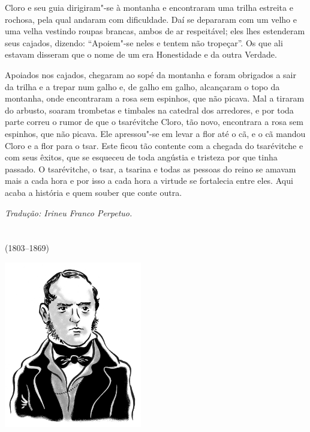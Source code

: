 Cloro e seu guia dirigiram"-se à montanha e encontraram uma trilha
estreita e rochosa, pela qual andaram com dificuldade. Daí se depararam
com um velho e uma velha vestindo roupas brancas, ambos de ar
respeitável; eles lhes estenderam seus cajados, dizendo: ``Apoiem"-se
neles e tentem não tropeçar''. Os que ali estavam disseram que o nome de
um era Honestidade e da outra Verdade.

Apoiados nos cajados, chegaram ao sopé da montanha e foram obrigados a
sair da trilha e a trepar num galho e, de galho em galho, alcançaram o
topo da montanha, onde encontraram a rosa sem espinhos, que não picava.
Mal a tiraram do arbusto, soaram trombetas e timbales na catedral dos
arredores, e por toda parte correu o rumor de que o tsarévitche Cloro,
tão novo, encontrara a rosa sem espinhos, que não picava. Ele apressou"-se
em levar a flor até o cã, e o cã mandou Cloro e a flor para o tsar. Este
ficou tão contente com a chegada do tsarévitche e com seus êxitos, que
se esqueceu de toda angústia e tristeza por que tinha passado. O
tsarévitche, o tsar, a tsarina e todas as pessoas do reino se amavam
mais a cada hora e por isso a cada hora a virtude se fortalecia entre eles. Aqui
acaba a história e quem souber que conte outra.\enlargethispage{\baselineskip}


{\footnotesize\hfill\emph{Tradução: Irineu Franco Perpetuo.}}

\chapter*{}
\label{part2}
\thispagestyle{empty}

\begin{vplace}[1.5]
{\HUGES\hfill{}}

{\LARGE\hfill\textlt(1803–1869)}
\end{vplace}

\pagebreak
\thispagestyle{empty}
\mbox{}
\vfill
\begin{center}
\includegraphics[width=6cm]{./imgs/autor2.jpg}
\end{center}


